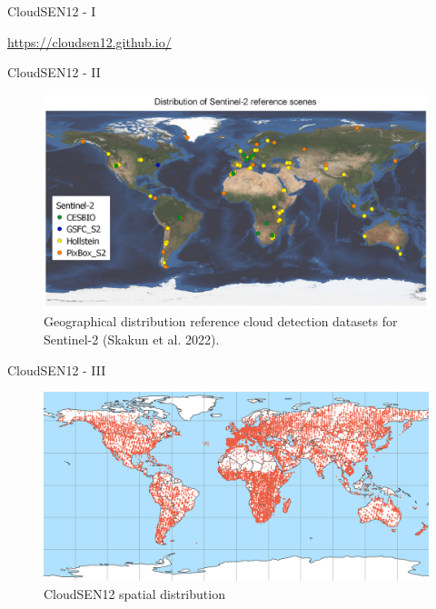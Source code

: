\begin{frame}{CloudSEN12 - I}
	\begin{center}
		\begin{figure}
		\end{figure}		
		\textcolor{blue}{\href{https://cloudsen12.github.io/}{https://cloudsen12.github.io/}}
	\end{center}
\end{frame}


\begin{frame}{CloudSEN12 - II}
	\begin{center}
		\begin{figure}
			\centering
			\includegraphics[width=0.85\linewidth]{images/intro_fig01.png}
			\caption[fig:introfig01]{Geographical distribution reference cloud detection datasets for Sentinel-2 (Skakun et al. 2022).}
			\label{fig:introfig01}
		\end{figure}
	\end{center}
\end{frame}

\begin{frame}{CloudSEN12 - III}
	\begin{center}
		\begin{figure}
			\includegraphics[width=0.85\linewidth]{images/intro_fig04.png}
			\caption[fig:introfig04]{CloudSEN12 spatial distribution}
		\end{figure}
	\end{center}
\end{frame}




